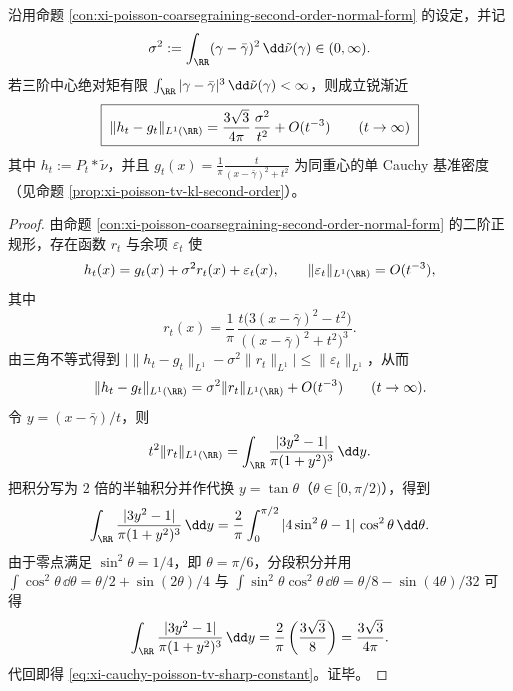 

\begin{theorem}\label{thm:xi-cauchy-poisson-tv-sharp-constant}
沿用命题 \ref{con:xi-poisson-coarsegraining-second-order-normal-form} 的设定，并记
\[
\sigma^2:=\int_{\RR}(\gamma-\bar\gamma)^2\,\dd\tilde\nu(\gamma)\in(0,\infty).
\]
若三阶中心绝对矩有限
\(
\int_{\RR}|\gamma-\bar\gamma|^3\,\dd\tilde\nu(\gamma)<\infty
\)，则成立锐渐近
\begin{equation}\label{eq:xi-cauchy-poisson-tv-sharp-constant}
\boxed{\;
\|h_t-g_t\|_{L^1(\RR)}
=\frac{3\sqrt3}{4\pi}\,\frac{\sigma^2}{t^2}+O(t^{-3})
\qquad(t\to\infty)\;}
\end{equation}
其中 \(h_t:=P_t*\tilde\nu\)，并且 \(g_t(x)=\frac{1}{\pi}\frac{t}{(x-\bar\gamma)^2+t^2}\) 为同重心的单 Cauchy 基准密度（见命题 \ref{prop:xi-poisson-tv-kl-second-order}）。
\end{theorem}

\begin{proof}
由命题 \ref{con:xi-poisson-coarsegraining-second-order-normal-form} 的二阶正规形，存在函数 \(r_t\) 与余项 \(\varepsilon_t\) 使
\[
h_t(x)=g_t(x)+\sigma^2 r_t(x)+\varepsilon_t(x),
\qquad
\|\varepsilon_t\|_{L^1(\RR)}=O(t^{-3}),
\]
其中
\[
r_t(x)=\frac{1}{\pi}\,
\frac{t\bigl(3(x-\bar\gamma)^2-t^2\bigr)}{\bigl((x-\bar\gamma)^2+t^2\bigr)^3}.
\]
由三角不等式得到
\(
\bigl|\|h_t-g_t\|_{L^1}-\sigma^2\|r_t\|_{L^1}\bigr|
\le \|\varepsilon_t\|_{L^1}
\)，从而
\[
\|h_t-g_t\|_{L^1(\RR)}
=\sigma^2\|r_t\|_{L^1(\RR)}+O(t^{-3})
\qquad(t\to\infty).
\]
令 \(y=(x-\bar\gamma)/t\)，则
\[
t^2\|r_t\|_{L^1(\RR)}
=\int_{\RR}\frac{|3y^2-1|}{\pi(1+y^2)^3}\,\dd y.
\]
把积分写为 \(2\) 倍的半轴积分并作代换 \(y=\tan\theta\)（\(\theta\in[0,\pi/2)\)），得到
\[
\int_{\RR}\frac{|3y^2-1|}{\pi(1+y^2)^3}\,\dd y
=\frac{2}{\pi}\int_{0}^{\pi/2}|4\sin^2\theta-1|\,\cos^2\theta\,\dd\theta.
\]
由于零点满足 \(\sin^2\theta=1/4\)，即 \(\theta=\pi/6\)，分段积分并用
\(
\int \cos^2\theta\,\dd\theta=\theta/2+\sin(2\theta)/4
\) 与
\(
\int \sin^2\theta\cos^2\theta\,\dd\theta=\theta/8-\sin(4\theta)/32
\)
可得
\[
\int_{\RR}\frac{|3y^2-1|}{\pi(1+y^2)^3}\,\dd y
=\frac{2}{\pi}\left(\frac{3\sqrt3}{8}\right)=\frac{3\sqrt3}{4\pi}.
\]
代回即得 \eqref{eq:xi-cauchy-poisson-tv-sharp-constant}。证毕。
\end{proof}

